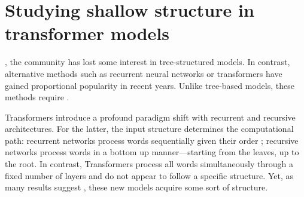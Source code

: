 \setchapterpreamble[u]{\margintoc}
\chapter{Studying shallow structure in transformer models}



, the community has lost some interest in tree-structured models. In contrast, alternative methods such as recurrent neural networks \parencite{hochreiter_97, cho_14} or transformers \parencite{vaswani_17} have gained proportional popularity in recent years. Unlike tree-based models, these methods require . 

Transformers introduce a profound paradigm shift with recurrent and recursive architectures. For the latter, the input structure determines the computational path: recurrent networks process words sequentially given their order ; recursive networks process words in a bottom up manner—starting from the leaves, up to the root. In contrast, Transformers process all words simultaneously through a fixed number of layers and do not appear to follow a specific structure. Yet, as many results suggest \parencite{linzen_16, jawahar_19, clark_19}, these new models acquire some sort of  structure.

